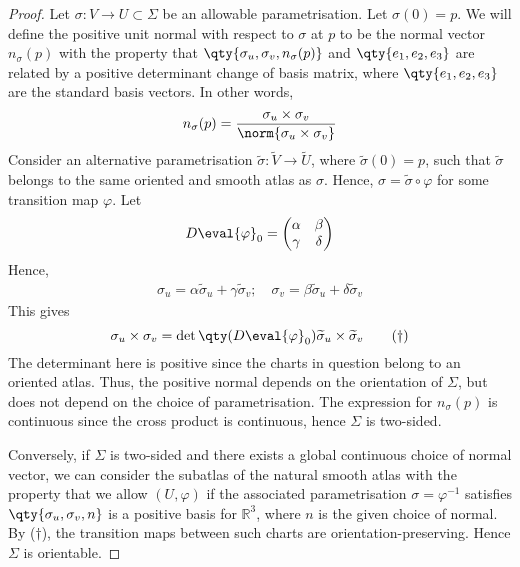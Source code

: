 \begin{proof}
	Let $\sigma \colon V \to U \subset \Sigma$ be an allowable parametrisation.
	Let $\sigma(0) = p$.
	We will define the positive unit normal with respect to $\sigma$ at $p$ to be the normal vector $n_\sigma(p)$ with the property that $\qty{\sigma_u, \sigma_v, n_\sigma(p)}$ and $\qty{e_1, e_2, e_3}$ are related by a positive determinant change of basis matrix, where $\qty{e_1, e_2, e_3}$ are the standard basis vectors.
	In other words,
	\begin{align*}
		n_\sigma(p) = \frac{\sigma_u \times \sigma_v}{\norm{\sigma_u \times \sigma_v}}
	\end{align*}
	Consider an alternative parametrisation $\widetilde \sigma \colon \widetilde V \to \widetilde U$, where $\widetilde \sigma(0) = p$, such that $\widetilde \sigma$ belongs to the same oriented and smooth atlas as $\sigma$.
	Hence, $\sigma = \widetilde \sigma \circ \varphi$ for some transition map $\varphi$.
	Let
	\begin{align*}
		D \eval{\varphi}_0 = \begin{pmatrix}
			\alpha & \beta  \\
			\gamma & \delta
		\end{pmatrix}
	\end{align*}
	Hence,
	\begin{align*}
		\sigma_u = \alpha \widetilde \sigma_u + \gamma \widetilde \sigma_v;\quad \sigma_v = \beta \widetilde \sigma_u + \delta \widetilde \sigma_v
	\end{align*}
	This gives
	\begin{equation}
		\sigma_u \times \sigma_v = \det\qty(D \eval{\varphi}_0) \widetilde \sigma_u \times \widetilde \sigma_v \tag{$\dagger$}
	\end{equation}
	The determinant here is positive since the charts in question belong to an oriented atlas.
	Thus, the positive normal depends on the orientation of $\Sigma$, but does not depend on the choice of parametrisation.
	The expression for $n_\sigma(p)$ is continuous since the cross product is continuous, hence $\Sigma$ is two-sided.

	Conversely, if $\Sigma$ is two-sided and there exists a global continuous choice of normal vector, we can consider the subatlas of the natural smooth atlas with the property that we allow $(U,\varphi)$ if the associated parametrisation $\sigma = \varphi^{-1}$ satisfies $\qty{\sigma_u, \sigma_v, n}$ is a positive basis for $\mathbb R^3$, where $n$ is the given choice of normal.
	By ($\dagger$), the transition maps between such charts are orientation-preserving.
	Hence $\Sigma$ is orientable.
\end{proof}

